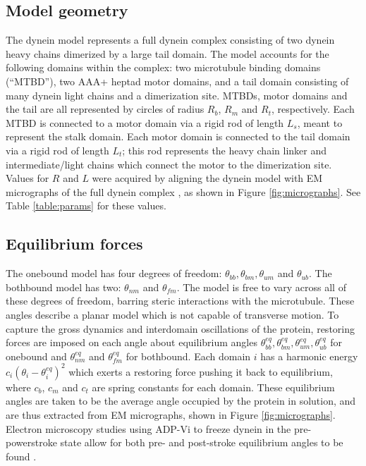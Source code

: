\documentclass[9pt,twocolumn,twoside]{pnas-new}
\begin{document}
\subsection*{Model geometry}
The dynein model represents a full dynein complex consisting of two dynein heavy chains dimerized by a large tail domain. The model accounts for the following domains within the complex: two microtubule binding domains (``MTBD''), two AAA+ heptad motor domains, and a tail domain consisting of many dynein light chains and a dimerization site. MTBDs, motor domains and the tail are all represented by circles of radius $R_b$, $R_m$ and $R_t$, respectively. Each MTBD is connected to a motor domain via a rigid rod of length $L_s$, meant to represent the stalk domain. Each motor domain is connected to the tail domain via a rigid rod of length $L_t$; this rod represents the heavy chain linker and intermediate/light chains which connect the motor to the dimerization site.\\

Values for $R$ and $L$ were acquired by aligning the dynein model with EM micrographs of the full dynein complex \cite{burgess-paper,grotjahn}, as shown in Figure \ref{fig:micrographs}. See Table \ref{table:params} for these values.\\

\subsection*{Equilibrium forces}
The onebound model has four degrees of freedom: $\theta_{bb}, \theta_{bm}, \theta_{um}$ and $\theta_{ub}$. The bothbound model has two: $\theta_{nm}$ and $\theta_{fm}$. The model is free to vary across all of these degrees of freedom, barring steric interactions with the microtubule. These angles describe a planar model which is not capable of transverse motion. To capture the gross dynamics and interdomain oscillations of the protein, restoring forces are imposed on each angle about equilibrium angles $\theta^{eq}_{bb}, \theta^{eq}_{bm}, \theta^{eq}_{um}, \theta^{eq}_{ub}$ for onebound and $\theta^{eq}_{nm}$ and $\theta^{eq}_{fm}$ for bothbound. Each domain $i$ has a harmonic energy $c_i\left(\theta_i-\theta^{eq}_i\right)^2$ which exerts a restoring force pushing it back to equilibrium, where $c_b$, $c_m$ and $c_t$ are spring constants for each domain. These equilibrium angles are taken to be the average angle occupied by the protein in solution, and are thus extracted from EM micrographs, shown in Figure \ref{fig:micrographs}. Electron microscopy studies using ADP-Vi to freeze dynein in the pre-powerstroke state allow for both pre- and post-stroke equilibrium angles to be found \cite{burgess-paper}.\\
\end{document}
